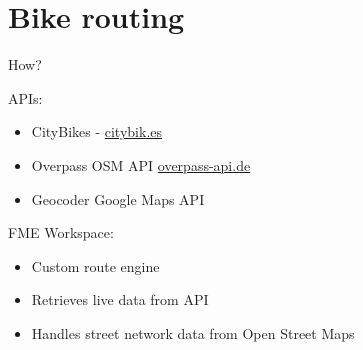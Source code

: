 \documentclass[10pt, compress]{beamer}
\begin{document}
{
\plain{}{}
}

\section{Bike routing}

\begin{frame}{How?}
    
    APIs:
    \begin{itemize}
        \item CityBikes - \url{citybik.es}
        \item Overpass OSM API \url{overpass-api.de}
        \item Geocoder Google Maps API
        
    \end{itemize}
    FME Workspace:
    \begin{itemize}
        \item Custom route engine
        \item Retrieves live data from API
        \item Handles street network data from Open Street Maps
    \end{itemize}

    
\end{frame}

{
\plain{}{}
}
\end{document}
